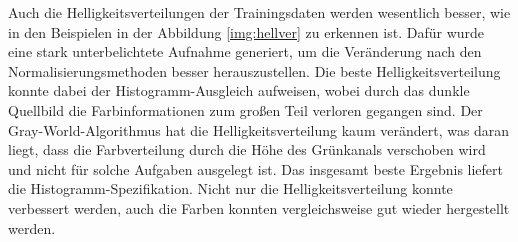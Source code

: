 Auch die Helligkeitsverteilungen der Trainingsdaten werden wesentlich besser, wie in den Beispielen in der Abbildung \ref{img:hellver} zu erkennen ist. Dafür wurde eine stark unterbelichtete Aufnahme generiert, um die Veränderung nach den Normalisierungsmethoden besser herauszustellen. Die beste Helligkeitsverteilung konnte dabei der Histogramm-Ausgleich aufweisen, wobei durch das dunkle Quellbild die Farbinformationen zum großen Teil verloren gegangen sind. Der Gray-World-Algorithmus hat die Helligkeitsverteilung kaum verändert, was daran liegt, dass die Farbverteilung durch die Höhe des Grünkanals verschoben wird und nicht für solche Aufgaben ausgelegt ist. Das insgesamt beste Ergebnis liefert die Histogramm-Spezifikation. Nicht nur die Helligkeitsverteilung konnte verbessert werden, auch die Farben konnten vergleichsweise gut wieder hergestellt werden.